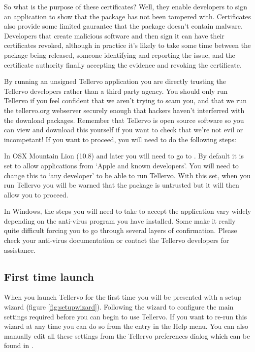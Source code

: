 So what is the purpose of these certificates?  Well, they enable developers to sign an application to show that the package has not been tampered with.  Certificates also provide some limited gaurantee that the package doesn't contain malware.  Developers that create malicious software and then sign it can have their certificates revoked, although in practice it's likely to take some time between the package being released, someone identifying and reporting the issue, and the certificate authority finally accepting the evidence and revoking the certificate.  

By running an unsigned Tellervo application you are directly trusting the Tellervo developers rather than a third party agency.  You should only run Tellervo if you feel confident that we aren't trying to scam you, and that we run the tellervo.org webserver securely enough that hackers haven't interferred with the download packages. Remember that Tellervo is open source software so you can view and download this yourself if you want to check that we're not evil or incompetant!  If you want to proceed, you will need to do the following steps:  

In OSX Mountain Lion (10.8) and later you will need to go to .  By default it is set to allow applications from `Apple and known developers'.  You will need to change this to `any developer' to be able to run Tellervo. With this set, when you run Tellervo you will be warned that the package is untrusted but it will then allow you to proceed.

In Windows, the steps you will need to take to accept the application vary widely depending on the anti-virus program you have installed.  Some make it really quite difficult forcing you to go through several layers of confirmation.  Please check your anti-virus documentation or contact the Tellervo developers for assistance.



\subsection{First time launch}
When you launch Tellervo for the first time you will be presented with a setup wizard (figure \ref{fig:setupwizard}).  Following the wizard to configure the main settings required before you can begin to use Tellervo.  If you want to re-run this wizard at any time you can do so from the entry in the Help menu. You can also manually edit all these settings from the Tellervo preferences dialog which can be found in .

